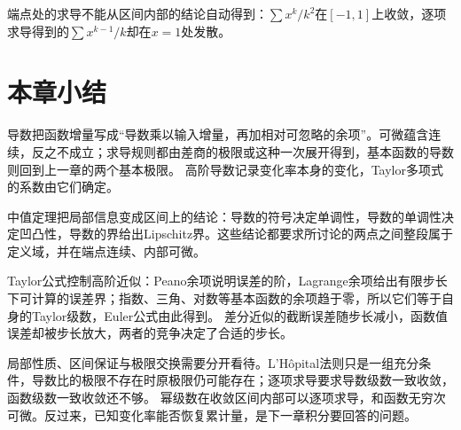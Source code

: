 端点处的求导不能从区间内部的结论自动得到：$\sum x^k/k^2$在$[-1,1]$上收敛，逐项求导得到的$\sum x^{k-1}/k$却在$x=1$处发散。

\FloatBarrier
\section{本章小结}
\label{sec:analysis-summary}

导数把函数增量写成“导数乘以输入增量，再加相对可忽略的余项”。可微蕴含连续，反之不成立；求导规则都由差商的极限或这种一次展开得到，基本函数的导数则回到上一章的两个基本极限。
高阶导数记录变化率本身的变化，Taylor多项式的系数由它们确定。

中值定理把局部信息变成区间上的结论：导数的符号决定单调性，导数的单调性决定凹凸性，导数的界给出Lipschitz界。这些结论都要求所讨论的两点之间整段属于定义域，并在端点连续、内部可微。

Taylor公式控制高阶近似：Peano余项说明误差的阶，Lagrange余项给出有限步长下可计算的误差界；指数、三角、对数等基本函数的余项趋于零，所以它们等于自身的Taylor级数，Euler公式由此得到。
差分近似的截断误差随步长减小，函数值误差却被步长放大，两者的竞争决定了合适的步长。

局部性质、区间保证与极限交换需要分开看待。L'Hôpital法则只是一组充分条件，导数比的极限不存在时原极限仍可能存在；逐项求导要求导数级数一致收敛，函数级数一致收敛还不够。
幂级数在收敛区间内部可以逐项求导，和函数无穷次可微。反过来，已知变化率能否恢复累计量，是下一章积分要回答的问题。
